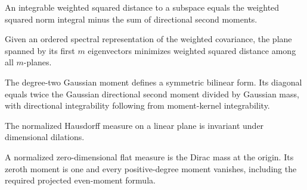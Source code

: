 \begin{lemma}
\label{lem:weighted-plane-energy-decomposition}

An integrable weighted squared distance to a subspace equals the weighted squared norm integral minus the sum of directional second moments.
\end{lemma}

\begin{lemma}
\label{lem:covariance-minimizing-plane}

Given an ordered spectral representation of the weighted covariance, the plane spanned by its first $m$ eigenvectors minimizes weighted squared distance among all $m$-planes.
\end{lemma}

\begin{lemma}
\label{lem:gaussian-bilinear-covariance}

The degree-two Gaussian moment defines a symmetric bilinear form. Its diagonal equals twice the Gaussian directional second moment divided by Gaussian mass, with directional integrability following from moment-kernel integrability.
\end{lemma}

\begin{lemma}
\label{lem:unit-flat-conical}

The normalized Hausdorff measure on a linear plane is invariant under dimensional dilations.
\end{lemma}

\begin{lemma}
\label{lem:zero-dimensional-flat-moments}

A normalized zero-dimensional flat measure is the Dirac mass at the origin. Its zeroth moment is one and every positive-degree moment vanishes, including the required projected even-moment formula.
\end{lemma}

